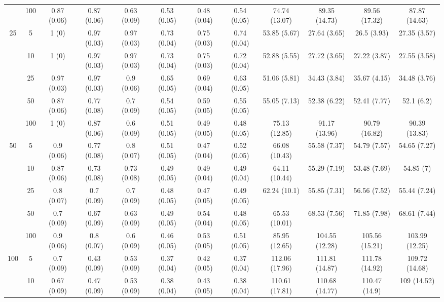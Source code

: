 \documentclass[11pt]{article}
\theoremstyle{definition}
\begin{document}
\begin{table}[H]
\begin{center}
{\begin{tabular}{cc|ccc|ccc|cccc|}
    & 100  & 0.87 (0.06) & 0.87 (0.06) & 0.63 (0.09) & 0.53 (0.05) & 0.48 (0.04) & 0.54 (0.05) & 74.74 (13.07) & 89.35 (14.73) & 89.56 (17.32) & 87.87 (14.63)\\[.3cm] 
   \multirow{5}{*}{25}  & 5  & 1 (0) & 0.97 (0.03) & 0.97 (0.03) & 0.73 (0.04) & 0.75 (0.03) & 0.74 (0.04) & 53.85 (5.67) & 27.64 (3.65) & 26.5 (3.93) & 27.35 (3.57) \\ 
    & 10  & 1 (0) & 0.97 (0.03) & 0.97 (0.03) & 0.73 (0.04) & 0.75 (0.03) & 0.72 (0.04) & 52.88 (5.55) & 27.72 (3.65) & 27.22 (3.87) & 27.55 (3.58) \\ 
    & 25  & 0.97 (0.03) & 0.97 (0.03) & 0.9 (0.06) & 0.65 (0.05) & 0.69 (0.04) & 0.63 (0.05) & 51.06 (5.81) & 34.43 (3.84) & 35.67 (4.15) & 34.48 (3.76) \\ 
    & 50  & 0.87 (0.06) & 0.77 (0.08) & 0.7 (0.09) & 0.54 (0.05) & 0.59 (0.05) & 0.55 (0.05) & 55.05 (7.13) & 52.38 (6.22) & 52.41 (7.77) & 52.1 (6.2) \\ 
    & 100  & 1 (0) & 0.87 (0.06) & 0.6 (0.09) & 0.51 (0.05) & 0.49 (0.05) & 0.48 (0.05) & 75.13 (12.85) & 91.17 (13.96) & 90.79 (16.82) & 90.39 (13.83) \\[.3cm]
   \multirow{5}{*}{50}  & 5  & 0.9 (0.06) & 0.77 (0.08) & 0.8 (0.07) & 0.51 (0.05) & 0.47 (0.04) & 0.52 (0.05) & 66.08 (10.43) & 55.58 (7.37) & 54.79 (7.57) & 54.65 (7.27) \\ 
    & 10  & 0.87 (0.06) & 0.73 (0.08) & 0.73 (0.08) & 0.49 (0.05) & 0.49 (0.04) & 0.49 (0.04) & 64.11 (10.44) & 55.29 (7.19) & 53.48 (7.69) & 54.85 (7) \\ 
    & 25  & 0.8 (0.07) & 0.7 (0.09) & 0.7 (0.09) & 0.48 (0.05) & 0.47 (0.05) & 0.49 (0.05) & 62.24 (10.1) & 55.85 (7.31) & 56.56 (7.52) & 55.44 (7.24) \\ 
    & 50  & 0.7 (0.09) & 0.67 (0.09) & 0.63 (0.09) & 0.49 (0.05) & 0.54 (0.04) & 0.48 (0.05) & 65.53 (10.01) & 68.53 (7.56) & 71.85 (7.98) & 68.61 (7.44) \\ 
    & 100  & 0.9 (0.06) & 0.8 (0.07) & 0.6 (0.09) & 0.46 (0.05) & 0.53 (0.05) & 0.51 (0.05) & 85.95 (12.65) & 104.55 (12.28) & 105.56 (15.21) & 103.99 (12.25) \\[.3cm] 
   \multirow{5}{*}{100}  & 5  & 0.7 (0.09) & 0.43 (0.09) & 0.53 (0.09) & 0.37 (0.04) & 0.42 (0.05) & 0.37 (0.04) & 112.06 (17.96) & 111.81 (14.87) & 111.78 (14.92) & 109.72 (14.68) \\ 
    & 10  & 0.67 (0.09) & 0.47 (0.09) & 0.53 (0.09) & 0.38 (0.04) & 0.43 (0.05) & 0.38 (0.04) & 110.61 (17.81) & 110.68 (14.77) & 110.47 (14.9) & 109 (14.52) \\ 

\end{tabular}}
\end{center}
\end{table}
\end{document}
